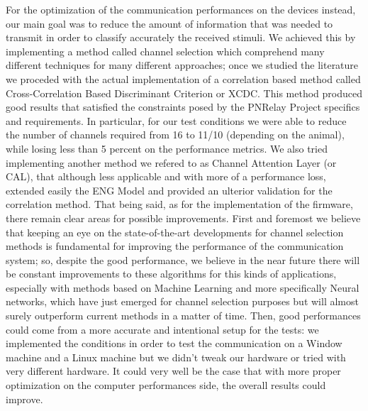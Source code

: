 \documentclass{Configuration_Files/PoliMi3i_thesis}
\begin{document}
For the optimization of the communication performances on the devices instead, our main goal was to reduce the amount of information that was needed to transmit in order to classify accurately the received stimuli.
We achieved this by implementing a method called channel selection which comprehend many different techniques for many different approaches; once we studied the literature we proceded with the actual implementation of a correlation based method called Cross-Correlation Based Discriminant Criterion or XCDC.
This method produced good results that satisfied the constraints posed by the PNRelay Project specifics and requirements.
In particular, for our test conditions we were able to reduce the number of channels required from 16 to 11/10 (depending on the animal), while losing less than 5 percent on the performance metrics.
We also tried implementing another method we refered to as Channel Attention Layer (or CAL), that although less applicable and with more of a performance loss, extended easily the ENG Model and provided an ulterior validation for the correlation method.
That being said, as for the implementation of the firmware, there remain clear areas for possible improvements.
First and foremost we believe that keeping an eye on the state-of-the-art developments for channel selection methods is fundamental for improving the performance of the communication system; so, despite the good performance, we believe in the near future there will be constant improvements to these algorithms for this kinds of applications, especially with methods based on Machine Learning and more specifically Neural networks, which have just emerged for channel selection purposes but will almost surely outperform current methods in a matter of time.
Then, good performances could come from a more accurate and intentional setup for the tests: we implemented the conditions in order to test the communication on a Window machine and a Linux machine but we didn't tweak our hardware or tried with very different hardware.
It could very well be the case that with more proper optimization on the computer performances side, the overall results could improve.

\printbibliography %

\end{document}
